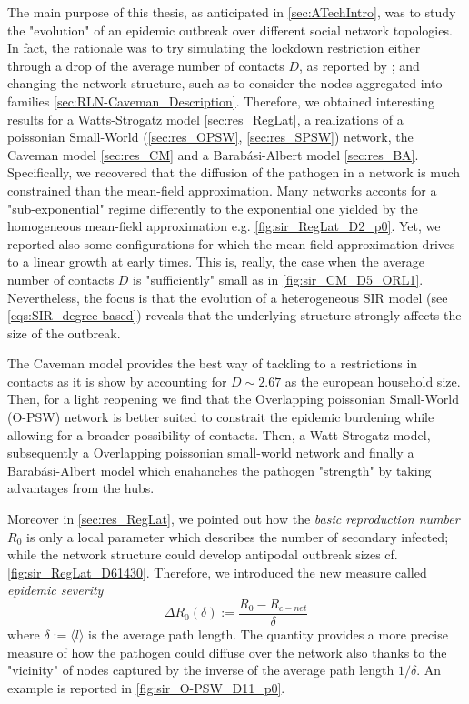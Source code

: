 \documentclass[a4paper,10pt,twoside]{book} %
\theoremstyle{definition}
\begin{document}
The main purpose of this thesis, as anticipated in \autoref{sec:ATechIntro}, was to study the "evolution" of an epidemic outbreak over different social network topologies. In fact, the rationale was to try simulating the lockdown restriction either through a drop of the average number of contacts $D$, as reported by \cite{Liu::2021_Review_SContactPattern}; and changing the network structure, such as to consider the nodes aggregated into families \autoref{sec:RLN-Caveman_Description}.
Therefore, we obtained interesting results for a Watts-Strogatz model \autoref{sec:res_RegLat}, a realizations of a poissonian Small-World (\autoref{sec:res_OPSW}, \autoref{sec:res_SPSW}) network,  the Caveman model \autoref{sec:res_CM} and a Barabási-Albert model \autoref{sec:res_BA}. 
Specifically, we recovered that the diffusion of the pathogen in a network is much constrained than the mean-field approximation. Many networks acconts for a  "sub-exponential" regime differently to the exponential one yielded by the homogeneous mean-field approximation e.g. \autoref{fig:sir_RegLat_D2_p0}. Yet, we reported also some configurations for which the mean-field approximation drives to a linear growth at early times. This is, really, the case when the average number of contacts $D$ is "sufficiently" small as in \autoref{fig:sir_CM_D5_ORL1}. Nevertheless, the focus is that the evolution of a heterogeneous SIR model (see \autoref{eqs:SIR_degree-based}) reveals that the underlying structure strongly affects the size of the outbreak.

The Caveman model provides the best way of tackling to a restrictions in contacts as it is show by accounting for $ D \sim 2.67$ as the european household size. Then, for a light reopening we find that the Overlapping poissonian Small-World (O-PSW) network is better suited to constrait the epidemic burdening while allowing for a broader possibility of contacts. Then, a Watt-Strogatz model, subsequently a Overlapping poissonian small-world network and finally a Barabási-Albert model which enahanches the pathogen "strength" by taking advantages from the hubs.  


Moreover in \autoref{sec:res_RegLat}, we pointed out how the \textit{basic reproduction number} $ R_0 $ is only a local parameter which describes the number of secondary infected; while the network structure could develop antipodal outbreak sizes cf. \autoref{fig:sir_RegLat_D61430}. Therefore, we introduced the new measure called \textit{epidemic severity}
\begin{equation}
	\Delta R_0 (\delta):= \frac{R_0 - R_{c-net}}{\delta}
	\label{eq:res_def_DR0delta}
\end{equation}
where $\delta:=\langle l \rangle $ is the average path length. The quantity provides a more precise measure of how the pathogen could diffuse over the network also thanks to the "vicinity" of nodes captured by the inverse of the average path length $1/\delta$. An example is reported in \autoref{fig:sir_O-PSW_D11_p0}.
\end{document}
